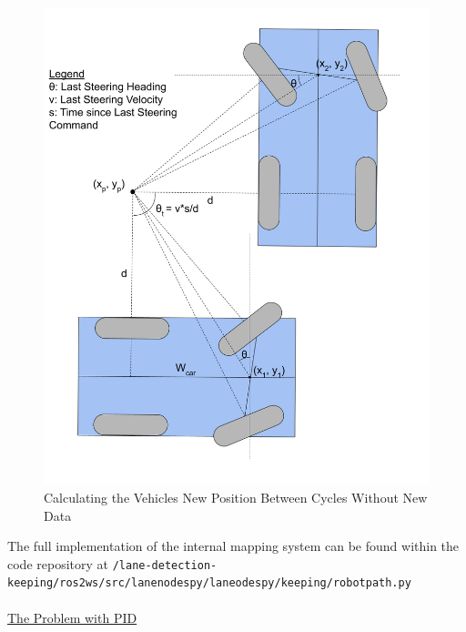 \documentclass[titlepage,draft]{article}
\begin{document}
{\begin{figure}
	\centering
	\includegraphics[width=5in]{update_description}
	\caption{Calculating the Vehicles New Position Between Cycles Without New Data}
	\label{fig:internal_update_determination}
\end{figure}

The full implementation of the internal mapping system can be found within the code repository at \texttt{/lane-detection-keeping/ros2\textunderscore ws/src/lane\textunderscore nodes\textunderscore py/lane\textunderscore odes\textunderscore py/keeping/robot\textunderscore path.py}\\~\\

\underline{The Problem with PID}

}
\end{document}
